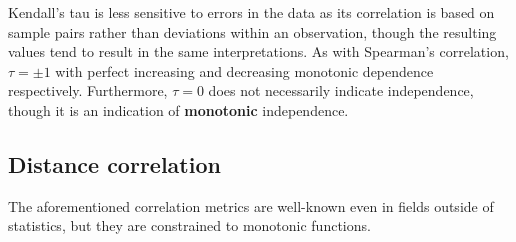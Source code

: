 Kendall's tau is less sensitive to errors in the data as its correlation is based on sample pairs rather than deviations within an observation, though the resulting values tend to result in the same interpretations. As with Spearman's correlation, $\tau=\pm1$ with perfect increasing and decreasing monotonic dependence respectively. Furthermore, $\tau=0$ does not necessarily indicate independence, though it is an indication of \textbf{monotonic} independence.

\subsection{Distance correlation}

The aforementioned correlation metrics are well-known even in fields outside of statistics, but they are constrained to monotonic functions. 